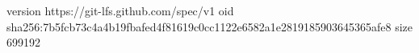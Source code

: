 version https://git-lfs.github.com/spec/v1
oid sha256:7b5fcb73c4a4b19fbafed4f81619c0cc1122e6582a1e2819185903645365afe8
size 699192
